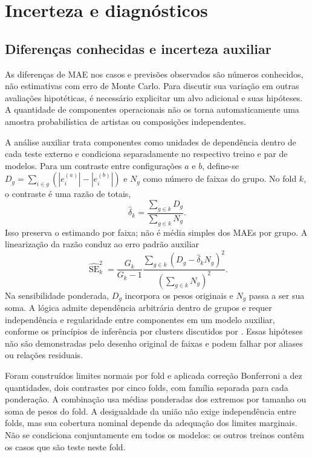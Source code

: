 \chapter{Incerteza e diagnósticos}\label{cap:diagnosticos}
\section{Diferenças conhecidas e incerteza auxiliar}
As diferenças de MAE nos casos e previsões observados são números conhecidos, não estimativas com erro de Monte Carlo. Para discutir sua variação em outras avaliações hipotéticas, é necessário explicitar um alvo adicional e suas hipóteses. A quantidade de componentes operacionais não os torna automaticamente uma amostra probabilística de artistas ou composições independentes.

A análise auxiliar trata componentes como unidades de dependência dentro de cada teste externo e condiciona separadamente no respectivo treino e par de modelos. Para um contraste entre configurações $a$ e $b$, define-se $D_g=\sum_{i\in g}(|e_i^{(a)}|-|e_i^{(b)}|)$ e $N_g$ como número de faixas do grupo. No fold $k$, o contraste é uma razão de totais,
\begin{equation}\label{eq:deltagrupo}
 \widehat\delta_k=\frac{\sum_{g\in k}D_g}{\sum_{g\in k}N_g}.
\end{equation}
Isso preserva o estimando por faixa; não é média simples dos MAEs por grupo. A linearização da razão conduz ao erro padrão auxiliar
\begin{equation}\label{eq:segrupo}
 \widehat{\operatorname{SE}}_k^2=
 \frac{G_k}{G_k-1}\frac{\sum_{g\in k}(D_g-\widehat\delta_kN_g)^2}
 {(\sum_{g\in k}N_g)^2}.
\end{equation}
Na sensibilidade ponderada, $D_g$ incorpora os pesos originais e $N_g$ passa a ser sua soma. A lógica admite dependência arbitrária dentro de grupos e requer independência e regularidade entre componentes em um modelo auxiliar, conforme os princípios de inferência por clusters discutidos por \citet{cameron2015}. Essas hipóteses não são demonstradas pelo desenho original de faixas e podem falhar por aliases ou relações residuais.

Foram construídos limites normais por fold e aplicada correção Bonferroni a dez quantidades, dois contrastes por cinco folds, com família separada para cada ponderação. A combinação usa médias ponderadas dos extremos por tamanho ou soma de pesos do fold. A desigualdade da união não exige independência entre folds, mas sua cobertura nominal depende da adequação dos limites marginais. Não se condiciona conjuntamente em todos os modelos: os outros treinos contêm os casos que são teste neste fold.

